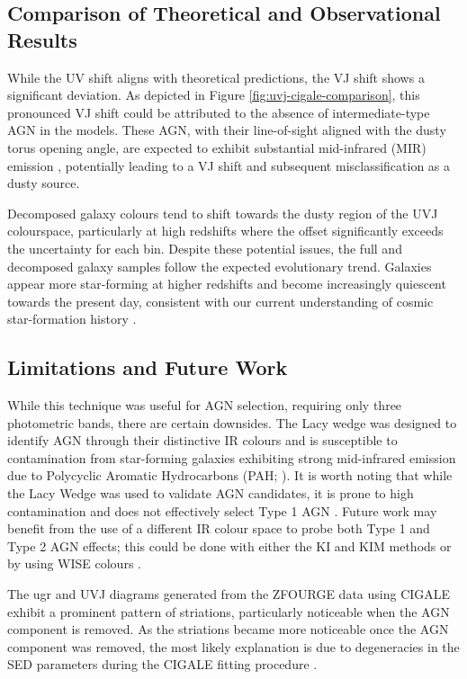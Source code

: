 \documentclass[
  journal=pasa,
  manuscript=research-paper,
  year=202X,
  volume=YY,
]{cup-journal}
\begin{document}
\subsection{Comparison of Theoretical and Observational Results}
\label{subsec:disc_comparison}

While the UV shift aligns with theoretical predictions, the VJ shift shows a significant deviation. As depicted in Figure \ref{fig:uvj-cigale-comparison}, this pronounced VJ shift could be attributed to the absence of intermediate-type AGN in the models. These AGN, with their line-of-sight aligned with the dusty torus opening angle, are expected to exhibit substantial mid-infrared (MIR) emission \citep{ciesla_constraining_2015}, potentially leading to a VJ shift and subsequent misclassification as a dusty source.

Decomposed galaxy colours tend to shift towards the dusty region of the UVJ colourspace, particularly at high redshifts where the offset significantly exceeds the uncertainty for each bin. Despite these potential issues, the full and decomposed galaxy samples follow the expected evolutionary trend. Galaxies appear more star-forming at higher redshifts and become increasingly quiescent towards the present day, consistent with our current understanding of cosmic star-formation history \citep{madau_cosmic_2014, kim_cosmic_2024}.

\subsection{Limitations and Future Work}
\label{subsec:disc_limitations}

While this technique was useful for AGN selection, requiring only three photometric bands, there are certain downsides. The Lacy wedge was designed to identify AGN through their distinctive IR colours and is susceptible to contamination from star-forming galaxies exhibiting strong mid-infrared emission due to Polycyclic Aromatic Hydrocarbons (PAH; \citealt{sajina_simulating_2005}). It is worth noting that while the Lacy Wedge was used to validate AGN candidates, it is prone to high contamination and does not effectively select Type 1 AGN \citep{donley_identifying_2012}. Future work may benefit from the use of a different IR colour space to probe both Type 1 and Type 2 AGN effects; this could be done with either the KI and KIM methods \citep{messias_new_2012, messias_dependency_2014} or by using WISE colours \citep{caccianiga_wise_2015}.

The ugr and UVJ diagrams generated from the ZFOURGE data using CIGALE exhibit a prominent pattern of striations, particularly noticeable when the AGN component is removed. As the striations became more noticeable once the AGN component was removed, the most likely explanation is due to degeneracies in the SED parameters during the CIGALE fitting procedure \citep{yang_x-cigale_2020}.
\end{document}
